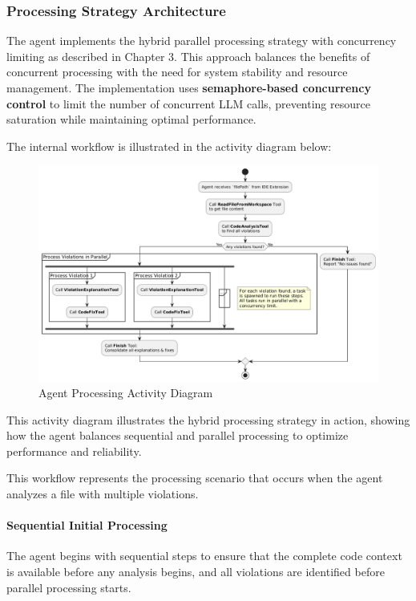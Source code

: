\begin{spacing}{1.2}
\subsubsection{Processing Strategy Architecture}
The agent implements the hybrid parallel processing strategy with concurrency limiting as described in Chapter 3. This approach balances the benefits of concurrent processing with the need for system stability and resource management. The implementation uses \textbf{semaphore-based concurrency control} to limit the number of concurrent LLM calls, preventing resource saturation while maintaining optimal performance.

The internal workflow is illustrated in the activity diagram below:

\begin{figure}[H]
	\centering
\includegraphics[scale=0.5]{images/activity_diagram.png}
\caption{Agent Processing Activity Diagram}
\label{fig:agent_activity}
\end{figure}

This activity diagram illustrates the hybrid processing strategy in action, showing how the agent balances sequential and parallel processing to optimize performance and reliability.

This workflow represents the processing scenario that occurs when the agent analyzes a file with multiple violations.

\paragraph{Sequential Initial Processing}
The agent begins with sequential steps to ensure that the complete code context is available before any analysis begins, and all violations are identified before parallel processing starts.


\end{spacing}
